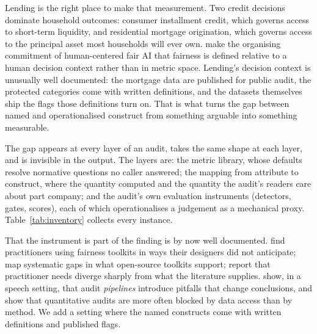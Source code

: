 \documentclass[sigconf,nonacm]{acmart}
\begin{document}
Lending is the right place to make that measurement. Two credit decisions
dominate household outcomes: consumer installment
credit, which governs access to short-term liquidity, and residential mortgage
origination, which governs access to the principal asset most households will
ever own. \citet{lee2020} make the organising commitment of human-centered
fair AI that fairness is defined relative to a human decision context rather
than in metric space. Lending's decision context is unusually well
documented: the mortgage data are published for public audit, the protected
categories come with written definitions, and the datasets themselves ship the
flags those definitions turn on. That is what turns the gap between named and
operationalised construct from something arguable into something measurable.

The gap appears at every layer of an audit, takes the same shape at each
layer, and is invisible in the output.
The layers are: the metric library, whose defaults resolve normative questions
no caller answered; the mapping from attribute to construct, where the
quantity computed and the quantity the audit's readers care about part
company; and the audit's own evaluation instruments (detectors, gates,
scores), each of which operationalises a judgement as a mechanical proxy.
Table~\ref{tab:inventory} collects every instance.

That the instrument is part of the finding is by now well documented.
\citet{deng2022} find practitioners using fairness toolkits in ways their
designers did not anticipate; \citet{leesingh2021} map systematic gaps in what
open-source toolkits support; \citet{holstein2019} report that practitioner
needs diverge sharply from what the literature supplies. \citet{mei2025} show,
in a speech setting, that audit \emph{pipelines} introduce pitfalls that change
conclusions, and \citet{zaccour2025} show that quantitative audits are more
often blocked by data access than by method. We add a setting where the named
constructs come with written definitions and published flags.
\end{document}
